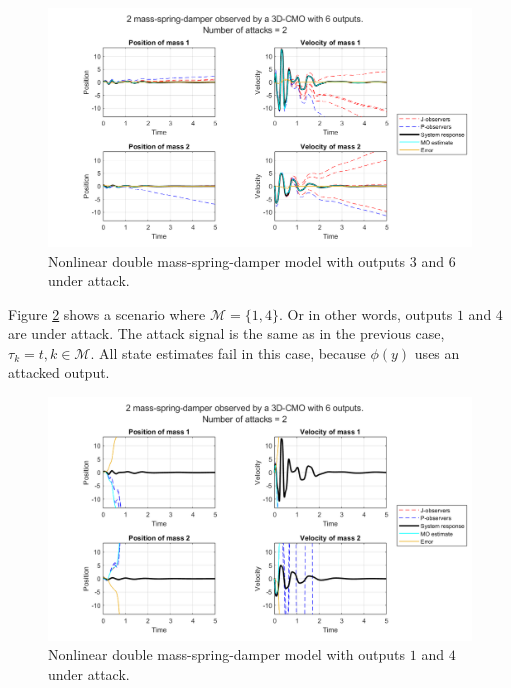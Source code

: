 \begin{example}
    \begin{figure}[H]
        \centering
        \includegraphics[width=\linewidth]{report/Figures/nonlinear_functional.png}
        \caption{Nonlinear double mass-spring-damper model with outputs $3$ and $6$ under attack.}
        \label{fig:nonlinear-functional}
    \end{figure}
    Figure \ref{fig:nonlinear-not-functional} shows a scenario where $\mathcal{M}=\{1,4\}$. Or in other words, outputs $1$ and $4$ are under attack. The attack signal is the same as in the previous case, $\tau_k=t,k \in \mathcal{M}$. All state estimates fail in this case, because $\phi(y)$ uses an attacked output.

    \begin{figure}[H]
        \centering
        \includegraphics[width=\linewidth]{report/Figures/nonlinear_not_functional.png}
        \caption{Nonlinear double mass-spring-damper model with outputs $1$ and $4$ under attack.}
        \label{fig:nonlinear-not-functional}
    \end{figure}
\end{example}

